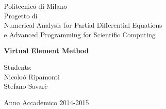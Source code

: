 \documentclass[oneside,12pt]{book}  %
\theoremstyle{plain}
\theoremstyle{definition}
\theoremstyle{remark}
\numberwithin{equation}{chapter} %
\begin{document}
\lstset{language=Matlab} 

\thispagestyle{empty}  %
\begin{center}  %
  {\Large Politecnico di Milano}\\[12pt]    %

  {\Huge Progetto di \\
  Numerical Analysis for Partial Differential Equations\\
  e Advanced Programming for Scientific Computing }
\end{center}


\begin{center}    %
  \Huge \bf Virtual Element Method
\end{center}
%
\vspace{12pt}
%
\begin{flushleft}
  \noindent\Large
  Students:\\
  Nicolo\`o Ripamonti \\
  Stefano Savar\`e\\
  
\end{flushleft}
%
%
\vspace{364pt}
%
\begin{center}
  \large
  Anno Accademico 2014-2015
\end{center}

\newpage

\tableofcontents  %




\renewcommand{\baselinestretch}{1.5} %

 
\end{document}
